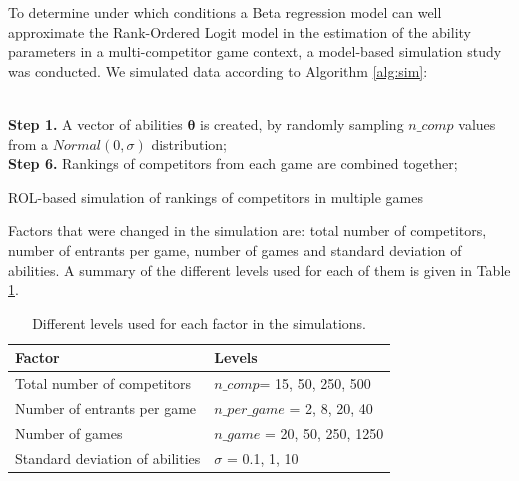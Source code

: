 To determine under which conditions a Beta regression model can well approximate the Rank-Ordered Logit model in the estimation of the ability parameters in a multi-competitor game context, a model-based simulation study was conducted. We simulated data according to Algorithm \ref{alg:sim}: \\
\\
\begin{algorithm}[H]
  \SetAlgoLined
  \textbf{Step 1.} A vector of abilities $\boldsymbol{\theta}$ is created, by randomly sampling $n\_comp$ values from a $Normal(0,\sigma)$ distribution; \\
  \textbf{Step 6.} Rankings of competitors from each game are combined together; 
  \caption{ROL-based simulation of rankings of competitors in multiple games}\label{alg:sim}
\end{algorithm}
\newpage
\noindent Factors that were changed in the simulation are: total number of competitors, number of entrants per game, number of games and standard deviation of abilities. A summary of the different levels used for each of them is given in Table \ref{tab}.
\begin{table}[h]
\centering
\begin{tabular}{l|l}
   Factor  & Levels \\
\hline
Total number of competitors & $n\_comp$= 15, 50, 250, 500\\
Number of entrants per game & $n\_per\_game$ = 2, 8, 20, 40 \\
Number of games & $n\_game$ = 20, 50, 250, 1250\\
Standard deviation of abilities & $\sigma$ = 0.1, 1, 10
\end{tabular}
\caption{Different levels used for each factor in the simulations.}
\label{tab}
\end{table}
